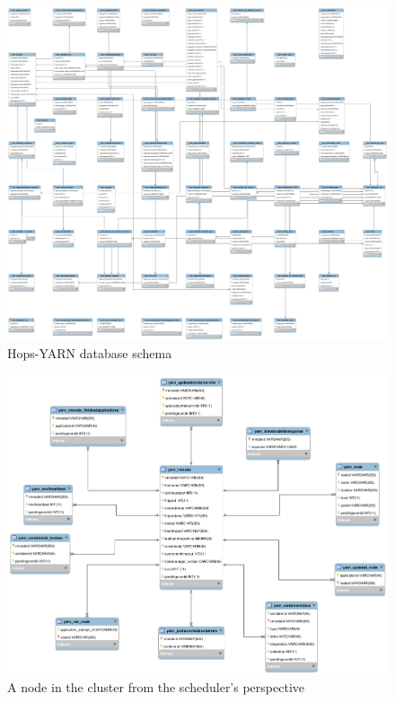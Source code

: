 \begin{figure}
\centering
\includegraphics[scale=0.2,angle=90]{resources/images/Implementation/hops_yarn_ndb_schema_full.png}
\caption{Hops-YARN database schema}
\label{fig:impl_fk_yarn_schema}
\end{figure}

\begin{figure}
\centering
\includegraphics[scale=0.4]{resources/images/Implementation/hops_yarn_ndb_schema_rmnode.png}
\caption{A node in the cluster from the scheduler's perspective}
\label{fig:impl_fk_yarn_rmnode}
\end{figure}

